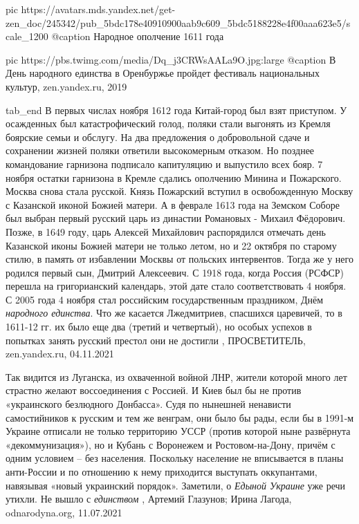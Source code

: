      pic https://avatars.mds.yandex.net/get-zen_doc/245342/pub_5bdc178e40910900aab9c609_5bdc5188228e4f00aaa623e5/scale_1200
		 @caption Народное ополчение 1611 года

		 pic https://pbs.twimg.com/media/Dq_j3CRWsAALa9O.jpg:large
		 @caption В День народного единства в Оренбуржье пройдет фестиваль национальных культур, zen.yandex.ru, 2019

  tab_end
\fi
В первых числах ноября 1612 года Китай-город был взят приступом. У осажденных
был катастрофический голод, поляки стали выгонять из Кремля боярские семьи и
обслугу. На два предложения о добровольной сдаче и сохранении жизней поляки
ответили высокомерным отказом. Но позднее командование гарнизона подписало
капитуляцию и выпустило всех бояр. 7 ноября остатки гарнизона в Кремле сдались
ополчению Минина и Пожарского. Москва снова стала русской. Князь Пожарский
вступил в освобожденную Москву с Казанской иконой Божией матери. А в феврале
1613 года на Земском Соборе был выбран первый русский царь из династии
Романовых - Михаил Фёдорович. Позже, в 1649 году, царь Алексей Михайлович
распорядился отмечать день Казанской иконы Божией матери не только летом, но и
22 октября по старому стилю, в память от избавлении Москвы от польских
интервентов. Тогда же у него родился первый сын, Дмитрий Алексеевич. С 1918
года, когда Россия (РСФСР) перешла на григорианский календарь, этой дате стало
соответствовать 4 ноября. С 2005 года 4 ноября стал российским государственным
праздником, Днём \emph{народного единства}.  Что же касается Лжедмитриев,
спасшихся царевичей, то в 1611-12 гг. их было еще два (третий и четвертый), но
особых успехов в попытках занять русский престол они не достигли
, 
ПРОСВЕТИТЕЛЬ, zen.yandex.ru, 04.11.2021

Так видится из Луганска, из охваченной войной ЛНР, жители которой  много лет
страстно желают воссоединения с Россией. И Киев был бы не против «украинского
безлюдного Донбасса». Судя по нынешней ненависти самостийников к русским и тем
же венграм, они было бы рады, если бы в 1991-м Украине отписали не только
территорию УССР (против которой ныне развёрнута «декоммунизация»), но и Кубань
с Воронежем и Ростовом-на-Дону, причём с одним условием – без населения.
Поскольку население не вписывается в планы анти-России и по отношению к нему
приходится выступать оккупантами, навязывая «новый украинский порядок».
Заметили, о \emph{Едыной Украине} уже речи утихли. Не вышло с \emph{единством}
, 
Артемий Глазунов; Ирина Лагода, odnarodyna.org, 11.07.2021

